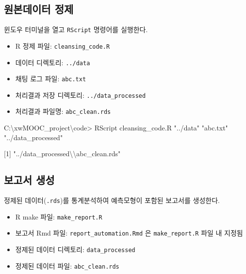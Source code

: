 \documentclass[
  letterpaper,
  chapter,a4paper,showtrims,openright,hidelinks]{oblivoir}
\newenvironment{Shaded}{\begin{snugshade}}{\end{snugshade}}
\newcommand{\DecValTok}[1]{\textcolor[rgb]{0.68,0.00,0.00}{#1}}
\newcommand{\NormalTok}[1]{\textcolor[rgb]{0.00,0.23,0.31}{#1}}
\newcommand{\SpecialCharTok}[1]{\textcolor[rgb]{0.37,0.37,0.37}{#1}}
\newcommand{\StringTok}[1]{\textcolor[rgb]{0.13,0.47,0.30}{#1}}
\providecommand{\tightlist}{%
  \setlength{\itemsep}{0pt}\setlength{\parskip}{0pt}}\usepackage{longtable,booktabs,array}
\begin{document}
\hypertarget{uxc6d0uxbcf8uxb370uxc774uxd130-uxc815uxc81c}{%
\subsection{원본데이터
정제}\label{uxc6d0uxbcf8uxb370uxc774uxd130-uxc815uxc81c}}

윈도우 터미널을 열고 \texttt{RScript} 명령어를 실행한다.

\begin{itemize}
\tightlist
\item
  R 정제 파일: \texttt{cleansing\_code.R}
\item
  데이터 디렉토리: \texttt{../data}
\item
  채팅 로그 파일: \texttt{abc.txt}
\item
  처리결과 저장 디렉토리: \texttt{../data\_processed}
\item
  처리결과 파일명: \texttt{abc\_clean.rds}
\end{itemize}

\begin{Shaded}
\begin{Highlighting}[]
\NormalTok{C}\SpecialCharTok{:}\NormalTok{\textbackslash{}xwMOOC\_project\textbackslash{}code}\SpecialCharTok{\textgreater{}}\NormalTok{ RScript cleansing\_code.R }\StringTok{"../data"} \StringTok{"abc.txt"} \StringTok{"../data\_processed"}

\NormalTok{[}\DecValTok{1}\NormalTok{] }\StringTok{"../data\_processed}\SpecialCharTok{\textbackslash{}\textbackslash{}}\StringTok{abc\_clean.rds"}
\end{Highlighting}
\end{Shaded}

\hypertarget{uxbcf4uxace0uxc11c-uxc0dduxc131}{%
\subsection{보고서 생성}\label{uxbcf4uxace0uxc11c-uxc0dduxc131}}

정제된 데이터(\texttt{.rds})를 통계분석하여 예측모형이 포함된 보고서를
생성한다.

\begin{itemize}
\tightlist
\item
  R make 파일: \texttt{make\_report.R}
\item
  보고서 Rmd 파일: \texttt{report\_automation.Rmd} 은
  \texttt{make\_report.R} 파일 내 지정됨
\item
  정제된 데이터 디렉토리: \texttt{data\_processed}
\item
  정제된 데이터 파일: \texttt{abc\_clean.rds}
\end{itemize}
\end{document}
